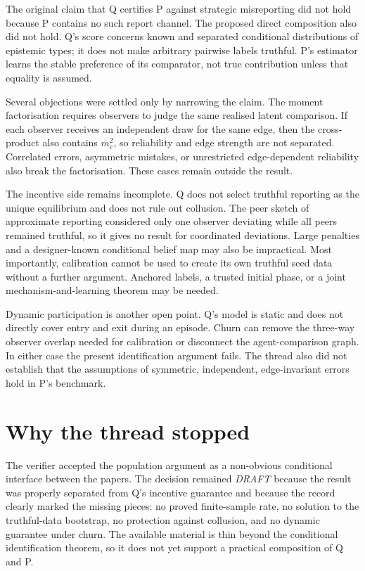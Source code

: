 \documentclass{article}
\begin{document}
The original claim that Q certifies P against strategic misreporting did not hold because P contains no such report channel.  The proposed direct composition also did not hold.  Q's score concerns known and separated conditional distributions of epistemic types; it does not make arbitrary pairwise labels truthful.  P's estimator learns the stable preference of its comparator, not true contribution unless that equality is assumed.

Several objections were settled only by narrowing the claim.  The moment factorisation requires observers to judge the same realised latent comparison.  If each observer receives an independent draw for the same edge, then the cross-product also contains $m_e^2$, so reliability and edge strength are not separated.  Correlated errors, asymmetric mistakes, or unrestricted edge-dependent reliability also break the factorisation.  These cases remain outside the result.

The incentive side remains incomplete.  Q does not select truthful reporting as the unique equilibrium and does not rule out collusion.  The peer sketch of approximate reporting considered only one observer deviating while all peers remained truthful, so it gives no result for coordinated deviations.  Large penalties and a designer-known conditional belief map may also be impractical.  Most importantly, calibration cannot be used to create its own truthful seed data without a further argument.  Anchored labels, a trusted initial phase, or a joint mechanism-and-learning theorem may be needed.

Dynamic participation is another open point.  Q's model is static and does not directly cover entry and exit during an episode.  Churn can remove the three-way observer overlap needed for calibration or disconnect the agent-comparison graph.  In either case the present identification argument fails.  The thread also did not establish that the assumptions of symmetric, independent, edge-invariant errors hold in P's benchmark.

\section{Why the thread stopped}

The verifier accepted the population argument as a non-obvious conditional interface between the papers.  The decision remained \emph{DRAFT} because the result was properly separated from Q's incentive guarantee and because the record clearly marked the missing pieces: no proved finite-sample rate, no solution to the truthful-data bootstrap, no protection against collusion, and no dynamic guarantee under churn.  The available material is thin beyond the conditional identification theorem, so it does not yet support a practical composition of Q and P.
\end{document}
